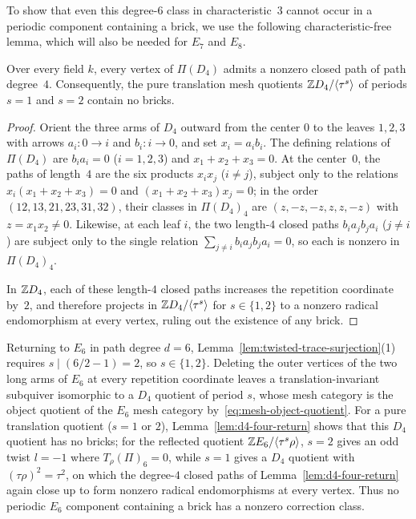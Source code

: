 To show that even this degree-$6$ class in characteristic~$3$ cannot occur in a periodic component containing a brick, we use the following characteristic-free lemma, which will also be needed for $E_7$ and $E_8$.

\begin{lemma}
\label{lem:d4-four-return}
Over every field $k$, every vertex of $\Pi(D_4)$ admits a nonzero closed path of path degree~$4$. Consequently, the pure translation mesh quotients $\mathbb Z D_4/\langle\tau^s\rangle$ of periods $s=1$ and $s=2$ contain no bricks.
\end{lemma}
\begin{proof}
Orient the three arms of $D_4$ outward from the center $0$ to the leaves $1,2,3$ with arrows $a_i\colon0\to i$ and $b_i\colon i\to0$, and set $x_i=a_ib_i$. The defining relations of $\Pi(D_4)$ are $b_ia_i=0$ ($i=1,2,3$) and $x_1+x_2+x_3=0$. At the center~$0$, the paths of length~$4$ are the six products $x_ix_j$ ($i\ne j$), subject only to the relations $x_i(x_1+x_2+x_3)=0$ and $(x_1+x_2+x_3)x_j=0$; in the order $(12,13,21,23,31,32)$, their classes in $\Pi(D_4)_4$ are $(z,-z,-z,z,z,-z)$ with $z=x_1x_2\ne0$. Likewise, at each leaf $i$, the two length-$4$ closed paths $b_ia_jb_ja_i$ ($j\ne i$) are subject only to the single relation $\sum_{j\ne i}b_ia_jb_ja_i=0$, so each is nonzero in $\Pi(D_4)_4$.

In $\mathbb Z D_4$, each of these length-$4$ closed paths increases the repetition coordinate by~$2$, and therefore projects in $\mathbb Z D_4/\langle\tau^s\rangle$ for $s\in\{1,2\}$ to a nonzero radical endomorphism at every vertex, ruling out the existence of any brick.
\end{proof}

Returning to $E_6$ in path degree $d=6$, Lemma~\ref{lem:twisted-trace-surjection}(1) requires $s\mid(6/2-1)=2$, so $s\in\{1,2\}$. Deleting the outer vertices of the two long arms of $E_6$ at every repetition coordinate leaves a translation-invariant subquiver isomorphic to a $D_4$ quotient of period $s$, whose mesh category is the object quotient of the $E_6$ mesh category by~\eqref{eq:mesh-object-quotient}. For a pure translation quotient ($s=1$ or $2$), Lemma~\ref{lem:d4-four-return} shows that this $D_4$ quotient has no bricks; for the reflected quotient $\mathbb Z E_6/\langle\tau^s\rho\rangle$, $s=2$ gives an odd twist $l=-1$ where $T_\rho(\Pi)_6=0$, while $s=1$ gives a $D_4$ quotient with $(\tau\rho)^2=\tau^2$, on which the degree-$4$ closed paths of Lemma~\ref{lem:d4-four-return} again close up to form nonzero radical endomorphisms at every vertex. Thus no periodic $E_6$ component containing a brick has a nonzero correction class.

